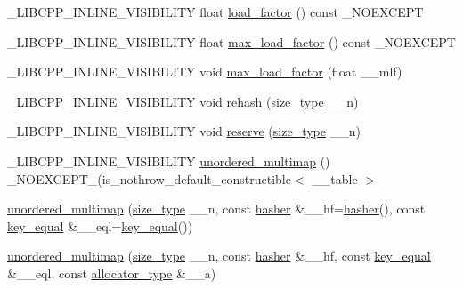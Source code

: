 \begin{DoxyCompactItemize}
\item 
\+\_\+\+L\+I\+B\+C\+P\+P\+\_\+\+I\+N\+L\+I\+N\+E\+\_\+\+V\+I\+S\+I\+B\+I\+L\+I\+T\+Y float \hyperlink{classunordered__multimap_a3ad10271dc7f291a6103f7f3192bbd19}{load\+\_\+factor} () const \+\_\+\+N\+O\+E\+X\+C\+E\+P\+T
\item 
\+\_\+\+L\+I\+B\+C\+P\+P\+\_\+\+I\+N\+L\+I\+N\+E\+\_\+\+V\+I\+S\+I\+B\+I\+L\+I\+T\+Y float \hyperlink{classunordered__multimap_abd38d2a9d0312fa5171c85cae5ba4b87}{max\+\_\+load\+\_\+factor} () const \+\_\+\+N\+O\+E\+X\+C\+E\+P\+T
\item 
\+\_\+\+L\+I\+B\+C\+P\+P\+\_\+\+I\+N\+L\+I\+N\+E\+\_\+\+V\+I\+S\+I\+B\+I\+L\+I\+T\+Y void \hyperlink{classunordered__multimap_ac629ea15bd223a3d57ee8ac322cb31e0}{max\+\_\+load\+\_\+factor} (float \+\_\+\+\_\+mlf)
\item 
\+\_\+\+L\+I\+B\+C\+P\+P\+\_\+\+I\+N\+L\+I\+N\+E\+\_\+\+V\+I\+S\+I\+B\+I\+L\+I\+T\+Y void \hyperlink{classunordered__multimap_a7e20cf0a491b48f5f05ca3672e28bbfb}{rehash} (\hyperlink{classunordered__multimap_a977c4093df6d4d0302f280de19af4b58}{size\+\_\+type} \+\_\+\+\_\+n)
\item 
\+\_\+\+L\+I\+B\+C\+P\+P\+\_\+\+I\+N\+L\+I\+N\+E\+\_\+\+V\+I\+S\+I\+B\+I\+L\+I\+T\+Y void \hyperlink{classunordered__multimap_a3cb4e04963106a818ef702bb98bb8ef1}{reserve} (\hyperlink{classunordered__multimap_a977c4093df6d4d0302f280de19af4b58}{size\+\_\+type} \+\_\+\+\_\+n)
\item 
\+\_\+\+L\+I\+B\+C\+P\+P\+\_\+\+I\+N\+L\+I\+N\+E\+\_\+\+V\+I\+S\+I\+B\+I\+L\+I\+T\+Y \hyperlink{classunordered__multimap_aa1f6b416690d0460698d001b15bede02}{unordered\+\_\+multimap} () \+\_\+\+N\+O\+E\+X\+C\+E\+P\+T\+\_\+(is\+\_\+nothrow\+\_\+default\+\_\+constructible$<$ \+\_\+\+\_\+table $>$
\item 
\hyperlink{classunordered__multimap_ad5a1781d30c2d18ba126f2efa19671f1}{unordered\+\_\+multimap} (\hyperlink{classunordered__multimap_a977c4093df6d4d0302f280de19af4b58}{size\+\_\+type} \+\_\+\+\_\+n, const \hyperlink{classunordered__multimap_a93affc33f5ee930cff353ff62d20daef}{hasher} \&\+\_\+\+\_\+hf=\hyperlink{classunordered__multimap_a93affc33f5ee930cff353ff62d20daef}{hasher}(), const \hyperlink{classunordered__multimap_aeed817e3baaf0771b8336eb2477f4f02}{key\+\_\+equal} \&\+\_\+\+\_\+eql=\hyperlink{classunordered__multimap_aeed817e3baaf0771b8336eb2477f4f02}{key\+\_\+equal}())
\item 
\hyperlink{classunordered__multimap_a4df1734040516b3fa505d5ad08404555}{unordered\+\_\+multimap} (\hyperlink{classunordered__multimap_a977c4093df6d4d0302f280de19af4b58}{size\+\_\+type} \+\_\+\+\_\+n, const \hyperlink{classunordered__multimap_a93affc33f5ee930cff353ff62d20daef}{hasher} \&\+\_\+\+\_\+hf, const \hyperlink{classunordered__multimap_aeed817e3baaf0771b8336eb2477f4f02}{key\+\_\+equal} \&\+\_\+\+\_\+eql, const \hyperlink{classunordered__multimap_a821ff3be687cecd9ef325efa93759c19}{allocator\+\_\+type} \&\+\_\+\+\_\+a)

\end{DoxyCompactItemize}

